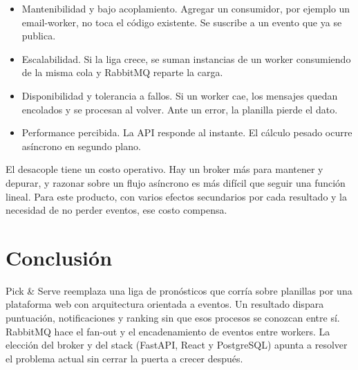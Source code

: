\begin{itemize}
\item Mantenibilidad y bajo acoplamiento. Agregar un consumidor, por ejemplo un email-worker, no toca el código existente. Se suscribe a un evento que ya se publica.
\item Escalabilidad. Si la liga crece, se suman instancias de un worker consumiendo de la misma cola y RabbitMQ reparte la carga.
\item Disponibilidad y tolerancia a fallos. Si un worker cae, los mensajes quedan encolados y se procesan al volver. Ante un error, la planilla pierde el dato.
\item Performance percibida. La API responde al instante. El cálculo pesado ocurre asíncrono en segundo plano.
\end{itemize}

El desacople tiene un costo operativo. Hay un broker más para mantener y depurar, y razonar sobre un flujo asíncrono es más difícil que seguir una función lineal. Para este producto, con varios efectos secundarios por cada resultado y la necesidad de no perder eventos, ese costo compensa.

\section{Conclusión}

Pick \& Serve reemplaza una liga de pronósticos que corría sobre planillas por una plataforma web con arquitectura orientada a eventos. Un resultado dispara puntuación, notificaciones y ranking sin que esos procesos se conozcan entre sí. RabbitMQ hace el fan-out y el encadenamiento de eventos entre workers. La elección del broker y del stack (FastAPI, React y PostgreSQL) apunta a resolver el problema actual sin cerrar la puerta a crecer después.
